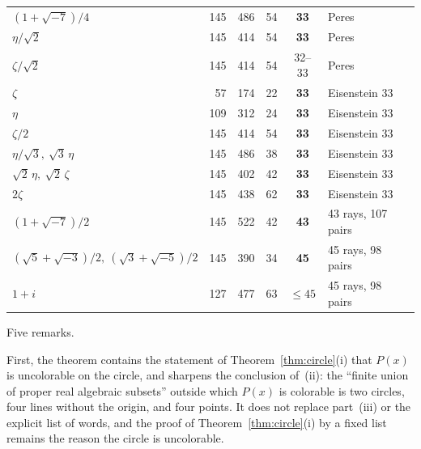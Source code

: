 \begin{table}[t]
\begin{tabular}{@{}lrrrcl@{}}
$(1+\sqrt{-7})/4$ & 145 & 486 & 54 & \textbf{33} & Peres \\
$\eta/\sqrt2$ & 145 & 414 & 54 & \textbf{33} & Peres \\
$\zeta/\sqrt2$ & 145 & 414 & 54 & 32--33 & Peres \\
$\zeta$ & 57 & 174 & 22 & \textbf{33} & Eisenstein 33 \\
$\eta$ & 109 & 312 & 24 & \textbf{33} & Eisenstein 33 \\
$\zeta/2$ & 145 & 414 & 54 & \textbf{33} & Eisenstein 33 \\
$\eta/\sqrt3,\ \sqrt3\,\eta$ & 145 & 486 & 38 & \textbf{33} & Eisenstein 33 \\
$\sqrt2\,\eta,\ \sqrt2\,\zeta$ & 145 & 402 & 42 & \textbf{33} & Eisenstein 33 \\
$2\zeta$ & 145 & 438 & 62 & \textbf{33} & Eisenstein 33 \\
$(1+\sqrt{-7})/2$ & 145 & 522 & 42 & \textbf{43} & 43 rays, 107 pairs \\
$(\sqrt5+\sqrt{-3})/2,\ (\sqrt3+\sqrt{-5})/2$ & 145 & 390 & 34 & \textbf{45} & 45 rays, 98 pairs \\
$1+i$ & 127 & 477 & 63 & $\le45$ & 45 rays, 98 pairs \\
\bottomrule
\end{tabular}
\end{table}

Five remarks.

First, the theorem contains the statement of Theorem~\ref{thm:circle}(i) that $P(x)$ is
uncolorable on the circle, and sharpens the conclusion of~(ii): the
``finite union of proper real algebraic subsets'' outside which $P(x)$ is colorable is two
circles, four lines without the origin, and four points.  It does not replace part~(iii) or the explicit list of
words, and the proof of Theorem~\ref{thm:circle}(i) by a fixed list remains the reason the
circle is uncolorable.

